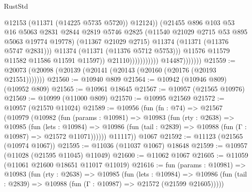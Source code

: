 \begin{lexlean}{RustStd}
\begin{coremodule}
                                                  @12153
                                                  (@11371 (@14225 @5735 @5720))
                                                  @12124))
                                              (@21455
                                                @896
                                                @103
                                                @53
                                                @16
                                                @5063
                                                @2831
                                                @2844
                                                @2819
                                                @5746
                                                @2825
                                                (@11540 @21029 @2715 @53 @895 @5063 @19774 @19778)
                                                (@11367 @21029 @2715)
                                                @11374
                                                (@11371 (@11376 @5747 @2831)))
                                              @11374
                                              (@11371 (@11376 @5712 @5753)))
                                            @11576
                                            @11579
                                            @11582
                                            @11586
                                            @11591
                                            @11597))
                                        @21110)))))))))))
                  @14487)))))))
@21559 := @20073 (@20098 (@20139 (@20141 (@20143 (@20160 (@20176 (@20193 @21551)))))))
@21560 := @10940 @809
@21564 := @10942 (@10946 @809) (@10952 @809)
@21565 := @10961 @18645
@21567 := @10957 (@21565 @10976)
@21569 := @10999 (@11000 @809)
@21570 := @10995 @21569
@21572 := @10957 (@21570 @11024)
@21589 := @10956
    (fun (fn : @74) =>
    @21567
      (@10979
        (@10982
          (fun (params : @10981) =>
          @10983
            (fun (rty : @2638) =>
            @10985
              (fun (lets : @10984) =>
              @10986 (fun (tail : @2839) => @10988 (fun (Γ : @10987) => @21572 @11071))))))
        @11117))
    @1067
@21592 := @11123 (@21565 (@10974 @1067))
@21595 := @11036 (@11037 @1067) @18648
@21599 := @10957 (@11028 (@21595 @11045) @11049)
@21600 := @11062 @1067
@21605 := @11059 (@11061 @21600 @18651 @11017 @11019)
@21616 := fun (params : @10981) =>
  @10983
    (fun (rty : @2638) =>
    @10985
      (fun (lets : @10984) =>
      @10986 (fun (tail : @2839) => @10988 (fun (Γ : @10987) => @21572 (@21599 @21605)))))

\end{coremodule}
\end{lexlean}
